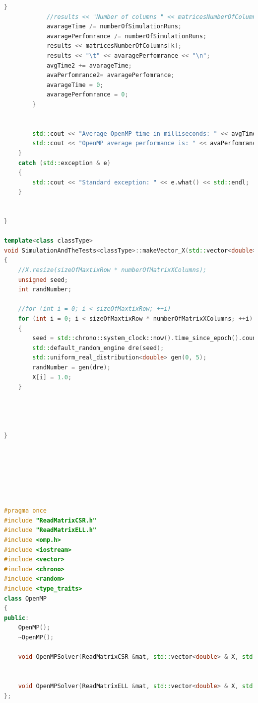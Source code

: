 \documentclass{scrreprt}
\begin{document}
\begin{lstlisting}[language=C++, caption=SimulationAndTheTests.cpp]
			}
			//results << "Number of columns " << matricesNumberOfColumns[k] << "\n";
			avarageTime /= numberOfSimulationRuns;
			avaragePerfomrance /= numberOfSimulationRuns;
			results << matricesNumberOfColumns[k];
			results << "\t" << avaragePerfomrance << "\n";
			avgTime2 += avarageTime;
			avaPerfomrance2= avaragePerfomrance;
			avarageTime = 0;
			avaragePerfomrance = 0;
		}


		std::cout << "Average OpenMP time in milliseconds: " << avgTime2 / matricesNumberOfColumns.size() << " ms\n";
		std::cout << "OpenMP average performance is: " << avaPerfomrance2 / matricesNumberOfColumns.size() << " MFLOPS\n" << std::endl;
	}
	catch (std::exception & e)
	{
		std::cout << "Standard exception: " << e.what() << std::endl;
	}


}

template<class classType>
void SimulationAndTheTests<classType>::makeVector_X(std::vector<double>& X, int sizeOfMaxtixRow, int numberOfMatrixXColumns)
{
	//X.resize(sizeOfMaxtixRow * numberOfMatrixXColumns);
	unsigned seed;
	int randNumber;
	
	//for (int i = 0; i < sizeOfMaxtixRow; ++i)
	for (int i = 0; i < sizeOfMaxtixRow * numberOfMatrixXColumns; ++i)
	{
		seed = std::chrono::system_clock::now().time_since_epoch().count();
		std::default_random_engine dre(seed);
		std::uniform_real_distribution<double> gen(0, 5);
		randNumber = gen(dre);
		X[i] = 1.0;
	}

	


}






\end{lstlisting}




\begin{lstlisting}[language=C++, caption=OpenMP.h]


#pragma once
#include "ReadMatrixCSR.h"
#include "ReadMatrixELL.h"
#include <omp.h>
#include <iostream>
#include <vector>
#include <chrono>
#include <random>
#include <type_traits>
class OpenMP
{
public:
	OpenMP();
	~OpenMP();

	void OpenMPSolver(ReadMatrixCSR &mat, std::vector<double> & X, std::vector<double> & Y, int threadsNumber, double & timeToComplete, unsigned int numberOfMatrixXColumn);


	void OpenMPSolver(ReadMatrixELL &mat, std::vector<double> & X, std::vector<double> & Y, int threadsNumber, double & timeToComplete, unsigned int numberOfMatrixXColumn);
};




\end{lstlisting}
\end{document}
